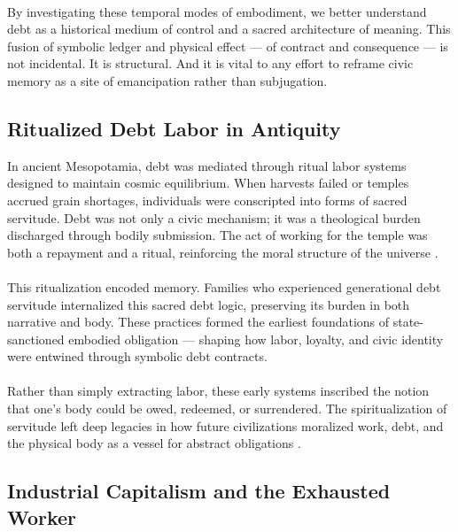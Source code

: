 \documentclass[12pt]{article}
\begin{document}
\paragraph{} By investigating these temporal modes of embodiment, we better understand debt as a historical medium of control and a sacred architecture of meaning. This fusion of symbolic ledger and physical effect — of contract and consequence — is not incidental. It is structural. And it is vital to any effort to reframe civic memory as a site of emancipation rather than subjugation.

\subsection{Ritualized Debt Labor in Antiquity}

In ancient Mesopotamia, debt was mediated through ritual labor systems designed to maintain cosmic equilibrium. When harvests failed or temples accrued grain shortages, individuals were conscripted into forms of sacred servitude. Debt was not only a civic mechanism; it was a theological burden discharged through bodily submission. The act of working for the temple was both a repayment and a ritual, reinforcing the moral structure of the universe \parencite{hudson2018and}.

\paragraph{} This ritualization encoded memory. Families who experienced generational debt servitude internalized this sacred debt logic, preserving its burden in both narrative and body. These practices formed the earliest foundations of state-sanctioned embodied obligation — shaping how labor, loyalty, and civic identity were entwined through symbolic debt contracts.

\paragraph{} Rather than simply extracting labor, these early systems inscribed the notion that one's body could be owed, redeemed, or surrendered. The spiritualization of servitude left deep legacies in how future civilizations moralized work, debt, and the physical body as a vessel for abstract obligations \parencite{graeber2011debt}.

\subsection{Industrial Capitalism and the Exhausted Worker}
\end{document}
